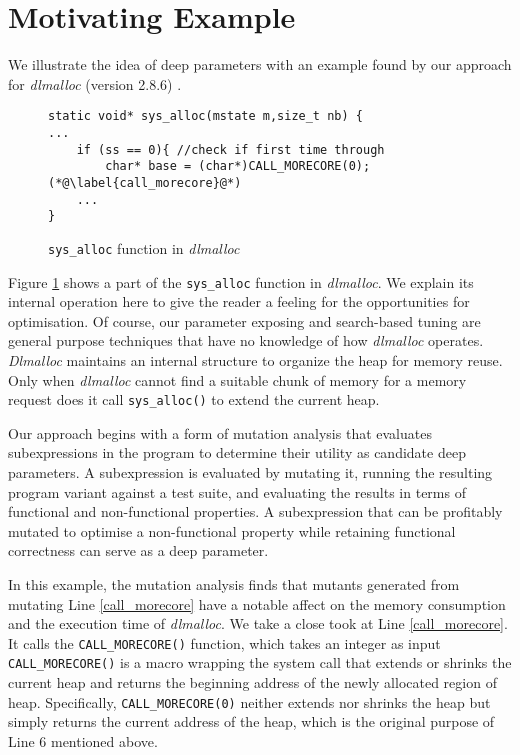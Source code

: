 
\section{Motivating Example}

We illustrate the idea of deep parameters with an example found by our approach for \emph{dlmalloc} (version 2.8.6) \cite{lea1996memory}.

\begin{figure}[ht]
\begin{lstlisting}
static void* sys_alloc(mstate m,size_t nb) {
...
	if (ss == 0){ //check if first time through
		char* base = (char*)CALL_MORECORE(0); (*@\label{call_morecore}@*)
	...
}
\end{lstlisting}
\vspace{-1.5em}
\caption{{\tt sys\_alloc} function in \emph{dlmalloc}}
\label{exp}
\end{figure}

Figure \ref{exp} shows a part of the {\tt sys\_alloc} function in \emph{dlmalloc}. We explain its internal operation here to give the reader a feeling for the opportunities for optimisation. Of course, our parameter exposing and search-based tuning are general purpose techniques that have no knowledge of how \emph{dlmalloc} operates. \emph{Dlmalloc} maintains an internal structure to organize the heap for memory reuse. Only when \emph{dlmalloc} cannot find a suitable chunk of memory for a memory request does it call {\tt sys\_alloc()} to extend the current heap.



Our approach begins with a form of mutation analysis that evaluates
subexpressions in the program to determine their utility as candidate
deep parameters. A subexpression is evaluated by mutating it, running
the resulting program variant against a test suite, and evaluating the
results in terms of functional and non-functional properties. A
subexpression that can be profitably mutated to optimise a non-functional
property while retaining functional correctness can serve as a deep
parameter.  

In this example, the mutation analysis finds that mutants generated from mutating Line \ref{call_morecore} have a notable affect on the memory consumption and the execution time of \emph{dlmalloc}. We take a close took at Line \ref{call_morecore}. It calls the {\tt CALL\_MORECORE()} function, which takes an integer as input
{\tt CALL\_MORECORE()} is a macro wrapping the system call that extends or shrinks the current heap and returns the beginning address of the newly allocated region of heap. Specifically, {\tt CALL\_MORECORE(0)} neither extends nor shrinks the heap but simply returns the current address of the heap, which is the original purpose of Line 6 mentioned above.

